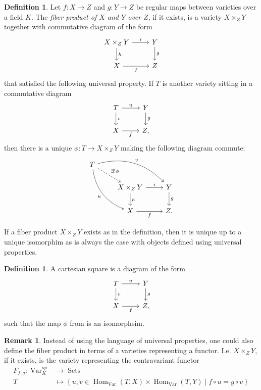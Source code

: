 \documentclass[a4paper,12pt,reqno]{amsart}
\newcommand{\set}[1]{\left\lbrace #1 \right\rbrace}
\DeclareMathOperator{\Var}{Var}
\DeclareMathOperator{\Sets}{Sets}
\DeclareMathOperator{\Hom}{Hom}
\theoremstyle{definition}
\newtheorem{definition}[lemma]{Definition}
\newtheorem{remark}[lemma]{Remark}
\numberwithin{lemma}{section}
\numberwithin{equation}{section}
\numberwithin{figure}{section}
\begin{document}
\begin{definition}\label{def:fiber-product-abstract}
Let $f: X \to Z$ and $g : Y \to Z$ be regular maps between varieties over a field $K$. The \textit{fiber product of $X$ and $Y$ over $Z$}, if it exists, is a variety $X \times_Z Y$ together with commutative diagram of the form 
\[
\begin{tikzcd}
	X \times_Z Y \arrow[r,"i"] \arrow[d,"h"] & Y \arrow[d, "g"] \\
	X \arrow[r, "f"'] & Z
\end{tikzcd}
\]
 that satisfied the following universal property. If $T$ is another variety sitting in a commutative diagram
\[
\begin{tikzcd}
	T \arrow[r,"u"] \arrow[d,"v"] & Y \arrow[d, "g"] \\
	X \arrow[r, "f"'] & Z,
\end{tikzcd}
\]
then there is a unique $\phi : T \to X\times_Z Y$ making the following diagram commute:
\[
\begin{tikzcd}
T \arrow[ddr, bend right, "u"'] \arrow[drr, bend left, "v"] \arrow[dr, dashed, "\exists !\phi"] & & \\
& X \times_Z Y \arrow[r,"i"] \arrow[d,"h"] & Y \arrow[d, "g"] \\
& X \arrow[r, "f"'] & Z.
\end{tikzcd}
\]
\end{definition}
If a fiber product $X\times_Z Y$ exists as in the definition, then it is unique up to a unique isomorphim as is always the case with objects defined using universal properties.

\begin{definition}\label{def:cartesian-square}
A cartesian square is a diagram of the form
\[
\begin{tikzcd}
	T \arrow[r,"u"] \arrow[d,"v"] & Y \arrow[d, "g"] \\
	X \arrow[r, "f"'] & Z,
\end{tikzcd}
\]
such that the map $\phi$ from  is an isomorphsim.
\end{definition}
\begin{remark}Instead of using the language of universal properties, one could also define the fiber product in terms of a varieties representing a functor. I.e.  $X \times_Z Y$, if it exists, is the variety representing the contravariant functor
	\begin{align*}
	    F_{f,g} : \Var_K^{op} &\to \Sets \\
	         T &\mapsto \set{u,v \in \Hom_{\Var}(T,X) \times \Hom_{\Var}(T,Y)  \mid f\circ u = g \circ v}
	\end{align*}
\end{remark}
\end{document}
